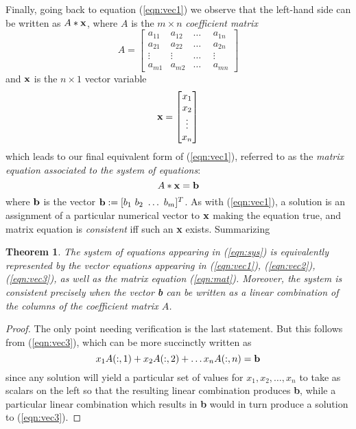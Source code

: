 \documentclass[11pt,notitlepage]{article}
\numberwithin{equation}{section}
\theoremstyle{plain}
\newtheorem{theorem}[equation]{Theorem}
\theoremstyle{definition}
\begin{document}
Finally, going back to equation (\ref{eqn:vec1}) we observe that the left-hand side can be written as $A*{\bf x}$, where $A$ is the $m\times n$ {\it coefficient matrix}
\begin{equation}
\label{eqn:coeff}
A = \begin{bmatrix}
a_{11}  &a_{12} &{}\ldots{} &a_{1n}\\ 
a_{21} &a_{22} &{}\ldots{} & a_{2n}\\
\vdots\ \  &  \vdots\ \  &  {}\ldots{}\ \  &  \vdots\\
a_{m1} &a_{m2} &{}\ldots{} &a_{mn} 
\end{bmatrix}
\end{equation}
and ${\bf x}$ is the $n\times 1$ vector variable
\begin{equation}
\label{eqn:coeff}
{\bf x} = \begin{bmatrix}
x_1\\ 
x_2\\
\vdots\\
x_n 
\end{bmatrix}
\end{equation}
which leads to our final equivalent form of (\ref{eqn:vec1}), referred to as the {\it matrix equation associated to the system of equations}:
\begin{equation}\label{eqn:mat}
A*{\bf x} = {\bf b}
\end{equation}
where ${\bf b}$ is the vector ${\bf b} := [b_1\  b_2\ \dots\  b_m]^T$. As with (\ref{eqn:vec1}), a solution is an assignment of a particular numerical vector to $\bf x$ making the equation true, and matrix equation is {\it consistent} iff such an {\bf x} exists. Summarizing

\begin{theorem} The system of equations appearing in (\ref{eqn:sys}) is equivalently represented by the vector equations appearing in (\ref{eqn:vec1}), (\ref{eqn:vec2}), (\ref{eqn:vec3}), as well as the matrix equation (\ref{eqn:mat}). Moreover, the system is consistent precisely when the vector {\bf b} can be written as a linear combination of the columns of the coefficient matrix $A$. 
\end{theorem}

\begin{proof} The only point needing verification is the last statement. But this follows from (\ref{eqn:vec3}), which can be more succinctly written as
\[
x_1 A(:,1) + x_2 A(:,2) +\dots x_n A(:,n) = {\bf b}
\]
 since any solution will yield a particular set of values for $x_1,x_2,\dots,x_n$ to take as scalars on the left so that the resulting linear combination produces {\bf b}, while a particular linear combination which results in {\bf b} would in turn produce a solution to (\ref{eqn:vec3}).
\end{proof}
\end{document}
